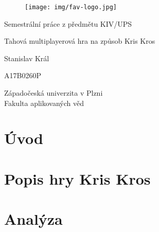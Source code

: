 \documentclass[12pt, a4paper]{article}
\let\oldsection\section
\renewcommand\section{\clearpage\oldsection}
\begin{document}
	\renewcommand{\lstlistingname}{Ukázka kódu}
	\renewcommand{\lstlistlistingname}{Seznam ukázek kódu}
    \begin{titlepage}

       \centering

       \vspace*{\baselineskip}

       \begin{figure}[H]
          \centering
          \texttt{[image: img/fav-logo.jpg]}
       \end{figure}

       \vspace*{1\baselineskip}
       {\sc Semestrální práce z předmětu KIV/UPS}
       \vspace*{1\baselineskip}

       \vspace{0.75\baselineskip}

       {\LARGE\sc Tahová multiplayerová hra na způsob Kris Kros\\}

       \vspace{4\baselineskip}
       
		\vspace{0.5\baselineskip}

       
       {\sc\Large Stanislav Král \\}

       \vspace{0.5\baselineskip}

       {A17B0260P}

       \vfill

       {\sc Západočeská univerzita v Plzni\\
       Fakulta aplikovaných věd}


    \end{titlepage}


    \tableofcontents
    \pagebreak


    
    \section{Úvod}
    \section{Popis hry Kris Kros}
    \section{Analýza}
\end{document}

